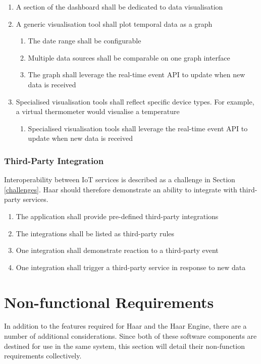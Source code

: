         \begin{enumerate}
          \item A section of the dashboard shall be dedicated to data visualisation
          \item A generic visualisation tool shall plot temporal data as a graph
          \begin{enumerate}
            \item The date range shall be configurable
            \item Multiple data sources shall be comparable on one graph interface
            \item The graph shall leverage the real-time event API to update when new data is received
          \end{enumerate}
          \item Specialised visualisation tools shall reflect specific device types. For example, a virtual thermometer would visualise a temperature
          \begin{enumerate}
            \item Specialised visualisation tools shall leverage the real-time event API to update when new data is received
          \end{enumerate}
        \end{enumerate}

      \subsubsection{Third-Party Integration}
        Interoperability between IoT services is described as a challenge in Section \ref{challenges}. Haar should therefore demonstrate an ability to integrate with third-party services.

        \begin{enumerate}
          \item The application shall provide pre-defined third-party integrations
          \item The integrations shall be listed as third-party rules
          \item One integration shall demonstrate reaction to a third-party event
          \item One integration shall trigger a third-party service in response to new data
        \end{enumerate}  

  \section{Non-functional Requirements}
    In addition to the features required for Haar and the Haar Engine, there are a number of additional considerations. Since both of these software components are destined for use in the same system, this section will detail their non-function requirements collectively.


